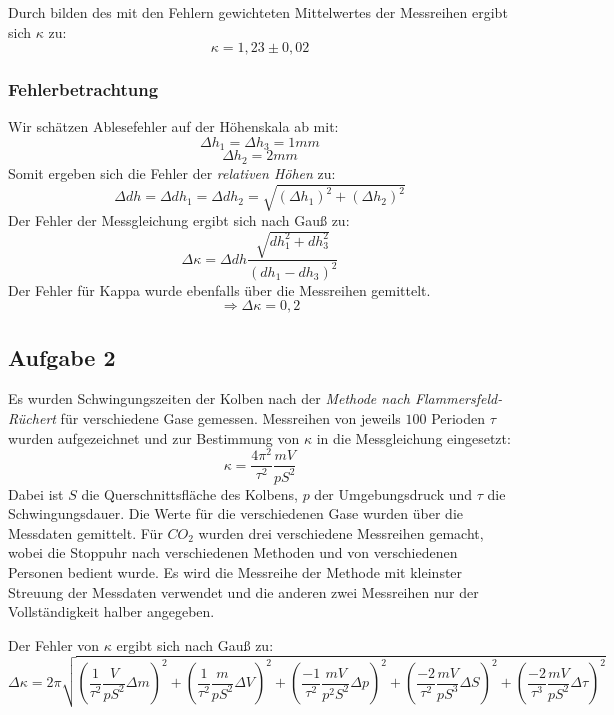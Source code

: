 \documentclass[%
   final,      %
   paper=a4, paper=portrait, pagesize=auto, %
   fontsize=11pt, %
   ngerman, %
 ]{scrartcl} %
\begin{document}
Durch bilden des mit den Fehlern gewichteten Mittelwertes der Messreihen ergibt sich $\kappa$ zu:
\begin{equation}
\kappa = 1,23 \pm 0,02
\end{equation}
\subsubsection{Fehlerbetrachtung}
Wir schätzen Ablesefehler auf der Höhenskala ab mit:
\[\Delta h_1 = \Delta h_3 = 1 mm\]
\[\Delta h_2 = 2mm\]
Somit ergeben sich die Fehler der \emph{relativen Höhen} zu:
\[\Delta dh = \Delta dh_1 = \Delta dh_2 = \sqrt{(\Delta h_1)^2 + (\Delta h_2)^2}\]
Der Fehler der Messgleichung ergibt sich nach Gauß zu:
\begin{equation}
\Delta\kappa = \Delta dh \frac{\sqrt{dh_1^2 + dh_3^2}}{(dh_1 -dh_3)^2}
\end{equation}
Der Fehler für Kappa wurde ebenfalls über die Messreihen gemittelt.
\[ \Longrightarrow\Delta \kappa = 0,2\]
\subsection{Aufgabe 2}
Es wurden Schwingungszeiten der Kolben nach der \emph{Methode nach Flammersfeld-Rüchert} für verschiedene Gase gemessen. Messreihen von jeweils $100$ Perioden $\tau$ wurden aufgezeichnet und zur Bestimmung von $\kappa$ in die Messgleichung eingesetzt:
\begin{equation}
\kappa = \frac{4\pi^2}{\tau^2}\frac{mV}{pS^2}
\end{equation}
Dabei ist $S$ die Querschnittsfläche des Kolbens, $p$ der Umgebungsdruck und $\tau$ die Schwingungsdauer.
Die Werte für die verschiedenen Gase wurden über die Messdaten gemittelt. Für $CO_2$ wurden drei verschiedene Messreihen gemacht, wobei die Stoppuhr nach verschiedenen Methoden und von verschiedenen Personen bedient wurde. Es wird die Messreihe der Methode mit kleinster Streuung der Messdaten verwendet und die anderen zwei Messreihen nur der Vollständigkeit halber angegeben.

Der Fehler von $\kappa$ ergibt sich nach Gauß zu:
\begin{equation}
\Delta \kappa = 2\pi\sqrt{
(\frac{1}{\tau^2}\frac{V}{pS^2}\Delta m)^2 + 
(\frac{1}{\tau^2}\frac{m}{pS^2}\Delta V)^2 + 
(\frac{-1}{\tau^2}\frac{mV}{p^2S^2}\Delta p)^2 + 
(\frac{-2}{\tau^2}\frac{mV}{pS^3}\Delta S)^2 + 
(\frac{-2}{\tau^3}\frac{mV}{pS^2}\Delta \tau)^2
}
\end{equation}
\end{document}
